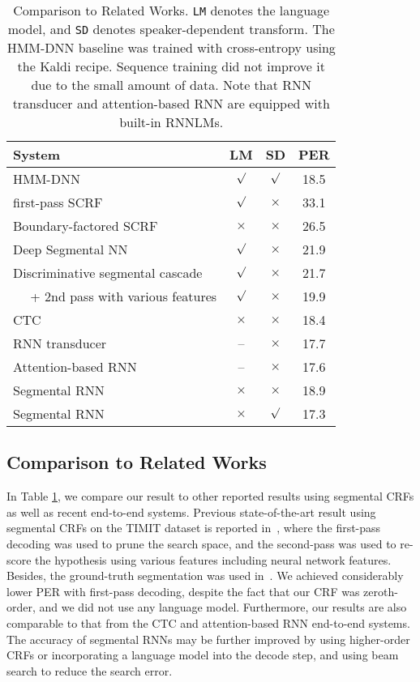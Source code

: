 \documentclass[a4paper]{article}
\begin{document}
 \begin{table}
 \centering \small
\caption{Comparison to Related Works. {\tt LM} denotes the language model, and {\tt SD} denotes speaker-dependent transform. The HMM-DNN baseline was trained with cross-entropy using the Kaldi recipe. Sequence training did not improve it due to the small amount of data. Note that RNN transducer and attention-based RNN are equipped with built-in RNNLMs.}\vskip 1.5mm

\label{tab:compare}
\begin{tabular}{l|ccc}
\hline

\hline
System  & LM & SD & PER  \\ \hline
HMM-DNN & $\surd$ & $\surd$  & 18.5 \\
first-pass SCRF~\cite{zweig2012classification} & $\surd$ & $\times$ & 33.1  \\
Boundary-factored SCRF~\cite{he2012efficient} & $\times$  & $\times$ & 26.5 \\
Deep Segmental NN~\cite{abdel2013deep} & $\surd$ & $\times$ & 21.9 \\
Discriminative segmental cascade~\cite{tang2015discriminative} & $\surd$ & $\times$ & 21.7 \\
$\quad$ + 2nd pass with various features & $\surd$ & $\times$ & 19.9 \\ \hline
CTC~\cite{graves2013speech} & $\times$ & $\times$ & 18.4 \\
RNN transducer~\cite{graves2013speech} & -- & $\times$ & 17.7 \\
Attention-based RNN~\cite{chorowski2015attention} & -- & $\times$ & 17.6 \\
Segmental RNN &$\times$ & $\times$ & 18.9 \\
Segmental RNN &$\times$ & $\surd$ & 17.3 \\
 
\hline

\hline
\end{tabular}
\vskip-4mm
\end{table}


\subsection{Comparison to Related Works }

In Table \ref{tab:compare}, we compare our result to other reported results using segmental CRFs as well as recent end-to-end systems. Previous state-of-the-art result using segmental CRFs on the TIMIT dataset is reported in~\cite{tang2015discriminative}, where the first-pass decoding was used to prune the search space, and the second-pass was used to re-score the hypothesis using various features including neural network features. Besides, the ground-truth segmentation was used in~\cite{tang2015discriminative}. We achieved considerably lower PER with first-pass decoding, despite the fact that our CRF was zeroth-order, and we did not use any language model. Furthermore, our results are also comparable to that from the CTC and attention-based RNN end-to-end systems. The accuracy of segmental RNNs may be further improved by using higher-order CRFs or incorporating a language model into the decode step, and using beam search to reduce the search error.
\end{document}
